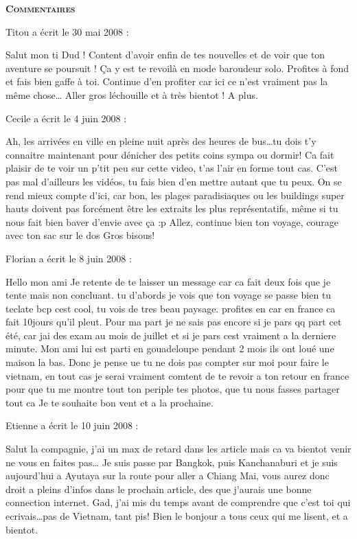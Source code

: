 \bigskip
\textbf{\textsc{Commentaires}}

\medskip
Titou a écrit le 30 mai 2008 :
\begin{displayquote}
Salut mon ti Dud !
Content d'avoir enfin de tes nouvelles et de voir que ton aventure se poursuit ! Ça y est te revoilà en mode baroudeur solo. Profites à fond et fais bien gaffe à toi.
Continue d'en profiter car ici ce n'est vraiment pas la même chose\dots
Aller gros léchouille et à très bientot !
A plus.
\end{displayquote}

\medskip
Cecile a écrit le 4 juin 2008 :
\begin{displayquote}
Ah, les arrivées en ville en pleine nuit après des heures de bus\dots tu dois t'y connaitre maintenant pour dénicher des petits coins sympa ou dormir!
Ca fait plaisir de te voir un p'tit peu sur cette video, t'as l'air en forme tout cas. C'est pas mal d'ailleurs les vidéos, tu fais bien d'en mettre autant que tu peux. On se rend mieux compte d'ici, car bon, les plages paradisiaques ou les buildings super hauts doivent pas forcément être les extraits les plus représentatifs, même si tu nous fait bien baver d'envie avec ça :p
Allez, continue bien ton voyage, courage avec ton sac sur le dos
Gros bisous!
\end{displayquote}

\medskip
Florian a écrit le 8 juin 2008 :
\begin{displayquote}
Hello mon ami
Je retente de te laisser un message car ca fait deux fois que je tente mais non concluant. tu d'abords je vois que ton voyage se passe bien tu teclate bcp cest cool, tu vois de tres beau paysage. profites en car en france ca fait 10jours qu'il pleut.
Pour ma part je ne sais pas encore si je pars qq part cet été, car jai des exam au mois de juillet et si je pars cest vraiment a la derniere minute.
Mon ami lui est parti en gouadeloupe pendant 2 mois ils ont loué une maison la bas.
Donc je pense ue tu ne dois pas compter sur moi pour faire le vietnam, en tout cas je serai vraiment comtent de te revoir a ton retour en france pour que tu me montre tout ton periple tes photos, que tu nous fasses partager tout ca
Je te souhaite bon vent et a la prochaine.
\end{displayquote}

\medskip
Etienne a écrit le 10 juin 2008 :
\begin{displayquote}
Salut la compagnie, j'ai un max de retard dans les article mais ca va bientot venir ne vous en faites pas\dots
Je suis passe par Bangkok, puis Kanchanaburi et je suis aujourd'hui a Ayutaya sur la route pour aller a Chiang Mai, vous aurez donc droit a pleins d'infos dans le prochain article, des que j'aurais une bonne connection internet.
Gad, j'ai mis du temps avant de comprendre que c'est toi qui ecrivais\dots pas de Vietnam, tant pis!
Bien le bonjour a tous ceux qui me lisent, et a bientot.
\end{displayquote}

